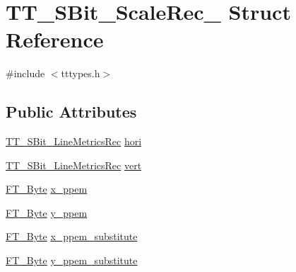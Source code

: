 \hypertarget{struct_t_t___s_bit___scale_rec__}{\section{T\-T\-\_\-\-S\-Bit\-\_\-\-Scale\-Rec\-\_\- Struct Reference}
\label{struct_t_t___s_bit___scale_rec__}
}


{\ttfamily \#include $<$tttypes.\-h$>$}

\subsection*{Public Attributes}
\begin{DoxyCompactItemize}
\item 
\hyperlink{tttypes_8h_a794b22300df0ccb224faed6c178e9ece}{T\-T\-\_\-\-S\-Bit\-\_\-\-Line\-Metrics\-Rec} \hyperlink{struct_t_t___s_bit___scale_rec___a2a61bc97ebb7ed996170a03612ffbbc0}{hori}
\item 
\hyperlink{tttypes_8h_a794b22300df0ccb224faed6c178e9ece}{T\-T\-\_\-\-S\-Bit\-\_\-\-Line\-Metrics\-Rec} \hyperlink{struct_t_t___s_bit___scale_rec___acbf5c459602d9f52ac04a914e2f12375}{vert}
\item 
\hyperlink{fttypes_8h_a51f26183ca0c9f4af958939648caeccd}{F\-T\-\_\-\-Byte} \hyperlink{struct_t_t___s_bit___scale_rec___a235731b0452ea063cccacd2f59b3f44c}{x\-\_\-ppem}
\item 
\hyperlink{fttypes_8h_a51f26183ca0c9f4af958939648caeccd}{F\-T\-\_\-\-Byte} \hyperlink{struct_t_t___s_bit___scale_rec___aa4c1fb419ea55c8c587ba81700c6ce66}{y\-\_\-ppem}
\item 
\hyperlink{fttypes_8h_a51f26183ca0c9f4af958939648caeccd}{F\-T\-\_\-\-Byte} \hyperlink{struct_t_t___s_bit___scale_rec___a71955e363b0b5da84ed2c15d0e6f832d}{x\-\_\-ppem\-\_\-substitute}
\item 
\hyperlink{fttypes_8h_a51f26183ca0c9f4af958939648caeccd}{F\-T\-\_\-\-Byte} \hyperlink{struct_t_t___s_bit___scale_rec___a3a9f554d0153f9e3022898c1f59a7b63}{y\-\_\-ppem\-\_\-substitute}
\end{DoxyCompactItemize}


